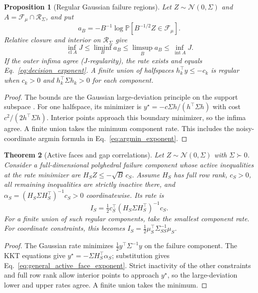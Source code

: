 \documentclass[a4paper,onecolumn,unpublished,nopdfoutputerror]{quantumarticle}
\theoremstyle{plain}
\newtheorem{theorem}{Theorem}[section]
\newtheorem{proposition}[theorem]{Proposition}
\theoremstyle{definition}
\newcommand{\Prob}{\mathbb{P}}
\newcommand{\calR}{\mathcal{R}}
\newcommand{\calF}{\mathcal{F}}
\newcommand{\calN}{\mathcal{N}}
\newcommand{\cl}{\operatorname{cl}}
\newcommand{\interior}{\operatorname{int}}
\newcommand{\1}{\mathbf{1}}
\begin{document}
\begin{proposition}[Regular Gaussian failure regions]
\label{prop:general_gaussian_rate}\label{lem:jregularity}
Let $Z\sim\calN(0,\Sigma)$ and $A=\calF_\mu\cap\calR_\Sigma$, and put
\[
a_B=-B^{-1}\log\Prob[B^{-1/2}Z\in\calF_\mu].
\]
Relative closure and interior on $\calR_\Sigma$ give
\begin{equation}
\inf_{\cl A}J\le\liminf_B a_B\le\limsup_B a_B\le\inf_{\interior A}J.
\end{equation}
If the outer infima agree ($J$-regularity), the rate exists and equals Eq.~\eqref{eq:decision_exponent}. A finite union of halfspaces $h_k^\top y\le-c_k$ is regular when $c_k>0$ and $h_k^\top\Sigma h_k>0$ for each component.
\end{proposition}

\begin{proof}
The bounds are the Gaussian large-deviation principle on the support subspace \cite{DemboZeitouni1998}. For one halfspace, its minimizer is $y^\star=-c\Sigma h/(h^\top\Sigma h)$ with cost $c^2/(2h^\top\Sigma h)$. Interior points approach this boundary minimizer, so the infima agree. A finite union takes the minimum component rate. This includes the noisy-coordinate argmin formula in Eq.~\eqref{eq:argmin_exponent}.
\end{proof}


\begin{theorem}[Active faces and gap correlations]
\label{thm:diagonal_offdiagonal}
Let $Z\sim\calN(0,\Sigma)$ with $\Sigma\succ0$. Consider a full-dimensional polyhedral failure component whose active inequalities at the rate minimizer are $H_SZ\le-\sqrt B\,c_S$. Assume $H_S$ has full row rank, $c_S>0$, all remaining inequalities are strictly inactive there, and $\alpha_S=(H_S\Sigma H_S^\top)^{-1}c_S>0$ coordinatewise. Its rate is
\begin{equation}\label{eq:general_active_face_exponent}
I_S=\tfrac12c_S^\top(H_S\Sigma H_S^\top)^{-1}c_S.
\end{equation}
For a finite union of such regular components, take the smallest component rate. For coordinate constraints, this becomes $I_S=\tfrac12\mu_S^\top\Sigma_{SS}^{-1}\mu_S$.
\end{theorem}

\begin{proof}
The Gaussian rate minimizes $\tfrac12y^\top\Sigma^{-1}y$ on the failure component. The KKT equations give $y^\star=-\Sigma H_S^\top\alpha_S$; substitution gives Eq.~\eqref{eq:general_active_face_exponent}. Strict inactivity of the other constraints and full row rank allow interior points to approach $y^\star$, so the large-deviation lower and upper rates agree. A finite union takes the minimum.
\end{proof}
\end{document}
